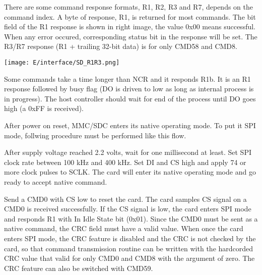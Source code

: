 
There are some command response formats, R1, R2, R3 and R7, depends on the
command index. A byte of response, R1, is returned for most commands. The bit
field of the R1 response is shown in right image, the value 0x00 means
successful. When any error occured, corresponding status bit in the response
will be set. The R3/R7 response (R1 + trailing 32-bit data) is for only CMD58
and CMD8.

\bigskip
\noindent\texttt{[image: E/interface/SD\_R1R3.png]}
\bigskip

Some commands take a time longer than NCR and it responds R1b. It is an R1
response followed by busy flag (DO is driven to low as long as internal process
is in progress). The host controller should wait for end of the process until DO
goes high (a 0xFF is received).

\secup

\secdown

After power on reset, MMC/SDC enters its native operating mode. To put it SPI
mode, follwing procedure must be performed like this flow.


After supply voltage reached 2.2 volts, wait for one millisecond at least. Set
SPI clock rate between 100 kHz and 400 kHz. Set DI and CS high and apply 74 or
more clock pulses to SCLK. The card will enter its native operating mode and go
ready to accept native command.


Send a CMD0 with CS low to reset the card. The card samples CS signal on a CMD0
is received successfully. If the CS signal is low, the card enters SPI mode and
responds R1 with In Idle State bit (0x01). Since the CMD0 must be sent as a
native command, the CRC field must have a valid value. When once the card enters
SPI mode, the CRC feature is disabled and the CRC is not checked by the card, so
that command transmission routine can be written with the hardcorded CRC value
that valid for only CMD0 and CMD8 with the argument of zero. The CRC feature can
also be switched with CMD59.


